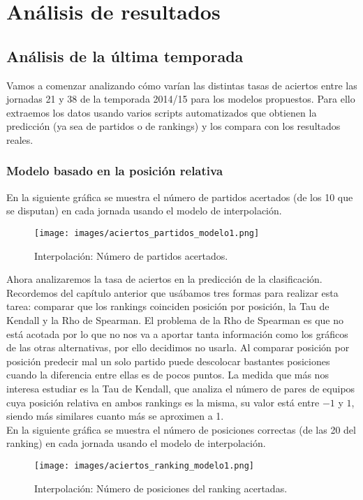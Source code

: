 \chapter{Análisis de resultados}
\section{Análisis de la última temporada}
Vamos a comenzar analizando cómo varían las distintas tasas de aciertos entre las jornadas 21 y 38 de la temporada 2014/15 para los modelos propuestos. Para ello extraemos los datos usando varios scripts automatizados que obtienen la predicción (ya sea de partidos o de rankings) y los compara con los resultados reales.

\subsection{Modelo basado en la posición relativa}
En la siguiente gráfica se muestra el número de partidos acertados (de los 10 que se disputan) en cada jornada usando el modelo de interpolación.
\begin{figure}[H]
	\centering
	\texttt{[image: images/aciertos\_partidos\_modelo1.png]}
	\caption{Interpolación: Número de partidos acertados.}
\end{figure}

Ahora analizaremos la tasa de aciertos en la predicción de la clasificación. Recordemos del capítulo anterior que usábamos tres formas para realizar esta tarea: comparar que los rankings coinciden posición por posición, la Tau de Kendall y la Rho de Spearman. El problema de la Rho de Spearman es que no está acotada por lo que no nos va a aportar tanta información como los gráficos de las otras alternativas, por ello decidimos no usarla. Al comparar posición por posición predecir mal un solo partido puede descolocar bastantes posiciones cuando la diferencia entre ellas es de pocos puntos. La medida que más nos interesa estudiar es la Tau de Kendall, que analiza el número de pares de equipos cuya posición relativa en ambos rankings es la misma, su valor está entre $-1$ y $1$, siendo más similares cuanto más se aproximen a 1.\\

En la siguiente gráfica se muestra el número de posiciones correctas (de las 20 del ranking) en cada jornada usando el modelo de interpolación.
\begin{figure}[H]
	\centering
	\texttt{[image: images/aciertos\_ranking\_modelo1.png]}
	\caption{Interpolación: Número de posiciones del ranking acertadas.}
\end{figure}

